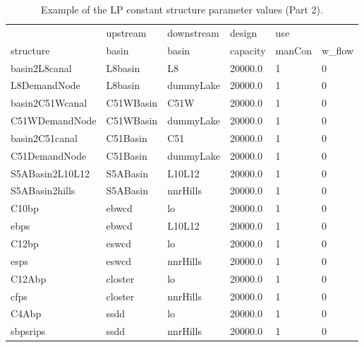 \begin{table}[!htb]
 \begin{center}
  \footnotesize
  \caption{Example of the LP constant structure parameter values (Part 2). }\label{strParaConst_2}
  \begin{tabular}{p{2.8cm}p{2.5cm}p{2.5cm}p{1.8cm}p{1.5cm}p{1.5cm}}\\[0.8ex]
                   &upstream       &downstream        &design         &use     &         \\
   structure       &basin          &basin             & capacity      &manCon  & w\_flow \\
  \hline
  basin2L8canal    &L8basin         &L8               &20000.0        &1       &0   \\
  L8DemandNode     &L8basin         &dummyLake        &20000.0        &1       &0   \\
  basin2C51Wcanal  &C51WBasin       &C51W             &20000.0        &1       &0   \\
  C51WDemandNode   &C51WBasin       &dummyLake        &20000.0        &1       &0   \\
  basin2C51canal   &C51Basin        &C51              &20000.0        &1       &0   \\
  C51DemandNode    &C51Basin        &dummyLake        &20000.0        &1       &0   \\
  S5ABasin2L10L12  &S5ABasin        &L10L12           &20000.0        &1       &0   \\
  S5ABasin2hills   &S5ABasin        &nnrHills         &20000.0        &1       &0   \\
  C10bp            &ebwcd           &lo               &20000.0        &1       &0   \\
  ebps             &ebwcd           &L10L12           &20000.0        &1       &0   \\
  C12bp            &eswcd           &lo               &20000.0        &1       &0   \\
  esps             &eswcd           &nnrHills         &20000.0        &1       &0   \\
  C12Abp           &closter         &lo               &20000.0        &1       &0   \\
  cfps             &closter         &nnrHills         &20000.0        &1       &0   \\
  C4Abp            &ssdd            &lo               &20000.0        &1       &0   \\
  sbpsrips         &ssdd            &nnrHills         &20000.0        &1       &0   \\

\end{tabular}
\end{center}
\end{table}

